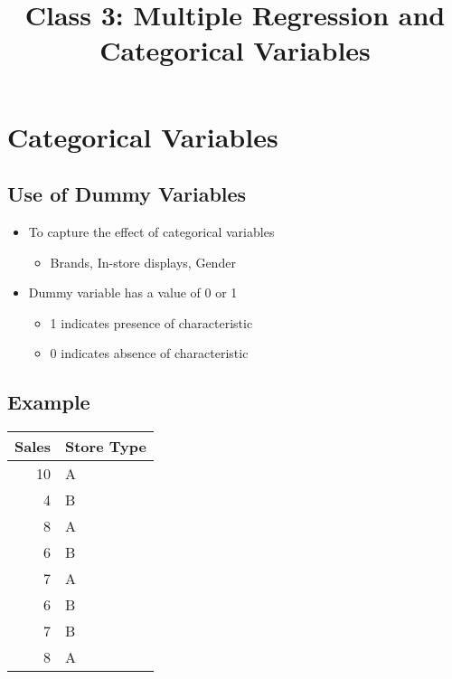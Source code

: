 \documentclass[10pt,article]{article}
\date{\vspace{-6ex}}
\title{Class 3: Multiple Regression and Categorical Variables}
\begin{document}
\maketitle
{} 
\thispagestyle{fancy}

\setcounter{tocdepth}{1}
\tableofcontents
\vspace{6ex}

\section{Categorical Variables}
\label{sec:org462ece1}
\subsection{Use of Dummy Variables}
\label{sec:org05b582a}
\begin{itemize}
\item To capture the effect of categorical variables
\begin{itemize}
\item Brands, In-store displays, Gender
\end{itemize}

\item Dummy variable has a value of 0 or 1
\begin{itemize}
\item 1 indicates presence of characteristic
\item 0 indicates absence of characteristic
\end{itemize}
\end{itemize}
\subsection{Example}
\label{sec:org8d318d4}

{\small
\begin{center}
\begin{tabular}{rl}
Sales & Store Type\\
\hline
10 & A\\
4 & B\\
8 & A\\
6 & B\\
7 & A\\
6 & B\\
7 & B\\
8 & A\\
\end{tabular}
\end{center}
}
\end{document}
